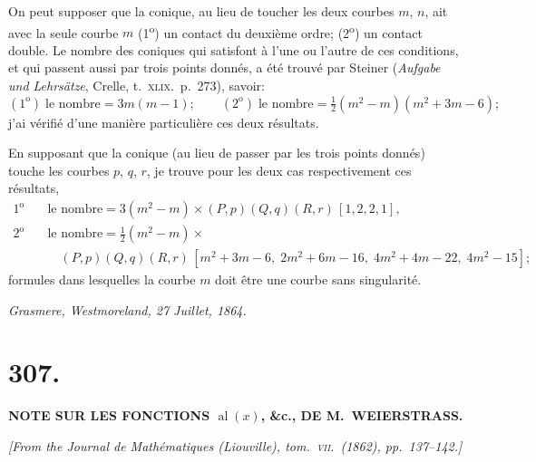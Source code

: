 \documentclass[11pt,a4paper]{article}
\providecommand{\al}{\mathop{\mathrm{al}}\nolimits}
\begin{document}
On peut supposer que la conique, au lieu de toucher les deux courbes $m$, $n$, ait avec la seule courbe $m$ (1\textsuperscript{o}) un contact du deuxi\`{e}me ordre; (2\textsuperscript{o}) un contact double. Le nombre des coniques qui satisfont \`{a} l'une ou l'autre de ces conditions, et qui passent aussi par trois points donn\'{e}s, a \'{e}t\'{e} trouv\'{e} par Steiner (\textit{Aufgabe und Lehrs\"{a}tze}, Crelle, t.\ \textsc{xlix}.\ p.\ 273), savoir:
\[
(1^{\mathrm{o}})\;\text{le nombre}=3m(m-1);\qquad (2^{\mathrm{o}})\;\text{le nombre}=\tfrac{1}{2}(m^2-m)(m^2+3m-6);
\]
j'ai v\'{e}rifi\'{e} d'une mani\`{e}re particuli\`{e}re ces deux r\'{e}sultats.

En supposant que la conique (au lieu de passer par les trois points donn\'{e}s) touche les courbes $p$, $q$, $r$, je trouve pour les deux cas respectivement ces r\'{e}sultats,
\begin{align*}
1^{\mathrm{o}} &\quad \text{le nombre}=3(m^2-m)\times (P,p)(Q,q)(R,r)\,[1,2,2,1],\\
2^{\mathrm{o}} &\quad \text{le nombre}=\tfrac{1}{2}(m^2-m)\times{}\\
& \qquad (P,p)(Q,q)(R,r)\,[m^2+3m-6,\;2m^2+6m-16,\;4m^2+4m-22,\;4m^2-15];
\end{align*}
formules dans lesquelles la courbe $m$ doit \^{e}tre une courbe sans singularit\'{e}.

\medskip

\noindent\textit{Grasmere, Westmoreland, 27 Juillet, 1864.}

\bigskip

\section*{307.}

\begin{center}
\textbf{NOTE SUR LES FONCTIONS $\al(x)$, \&c., DE M.~WEIERSTRASS.}
\end{center}

\bigskip

\noindent\textit{[From the Journal de Math\'{e}matiques (Liouville), tom.\ \textsc{vii}.\ (1862), pp.\ 137--142.]}

\bigskip
\end{document}
